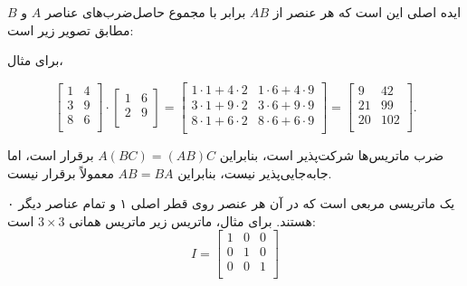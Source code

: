 ایده اصلی این است که هر عنصر از $AB$
برابر با مجموع حاصل‌ضرب‌های عناصر $A$ و $B$
مطابق تصویر زیر است:

\begin{center}
\end{center}

برای مثال،

\[
 \begin{bmatrix}
  1 & 4 \\
  3 & 9 \\
  8 & 6 \\
 \end{bmatrix}
\cdot
 \begin{bmatrix}
  1 & 6 \\
  2 & 9 \\
 \end{bmatrix}
=
 \begin{bmatrix}
  1 \cdot 1 + 4 \cdot 2 & 1 \cdot 6 + 4 \cdot 9 \\
  3 \cdot 1 + 9 \cdot 2 & 3 \cdot 6 + 9 \cdot 9 \\
  8 \cdot 1 + 6 \cdot 2 & 8 \cdot 6 + 6 \cdot 9 \\
 \end{bmatrix}
=
 \begin{bmatrix}
  9 & 42 \\
  21 & 99 \\
  20 & 102 \\
 \end{bmatrix}.
\]

ضرب ماتریس‌ها شرکت‌پذیر است،
بنابراین $A(BC)=(AB)C$ برقرار است،
اما جابه‌جایی‌پذیر نیست،
بنابراین $AB = BA$ معمولاً برقرار نیست.


یک  ماتریسی مربعی است
که در آن هر عنصر روی قطر اصلی ۱
و تمام عناصر دیگر ۰ هستند.
برای مثال، ماتریس زیر
ماتریس همانی $3 \times 3$ است:
\[
 I = \begin{bmatrix}
  1 & 0 & 0 \\
  0 & 1 & 0 \\
  0 & 0 & 1 \\
 \end{bmatrix}
\]

